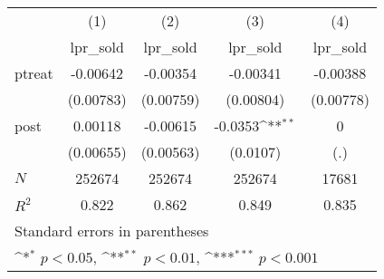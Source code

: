 {
\def\sym#1{\ifmmode^{#1}\else\(^{#1}\)\fi}
\begin{tabular}{l*{4}{c}}
\hline\hline
            &\multicolumn{1}{c}{(1)}&\multicolumn{1}{c}{(2)}&\multicolumn{1}{c}{(3)}&\multicolumn{1}{c}{(4)}\\
            &\multicolumn{1}{c}{lpr\_sold}&\multicolumn{1}{c}{lpr\_sold}&\multicolumn{1}{c}{lpr\_sold}&\multicolumn{1}{c}{lpr\_sold}\\
\hline
ptreat      &    -0.00642         &    -0.00354         &    -0.00341         &    -0.00388         \\
            &   (0.00783)         &   (0.00759)         &   (0.00804)         &   (0.00778)         \\
[1em]
post        &     0.00118         &    -0.00615         &     -0.0353\sym{**} &           0         \\
            &   (0.00655)         &   (0.00563)         &    (0.0107)         &         (.)         \\
\hline
\(N\)       &      252674         &      252674         &      252674         &       17681         \\
\(R^{2}\)   &       0.822         &       0.862         &       0.849         &       0.835         \\
\hline\hline
\multicolumn{5}{l}{\footnotesize Standard errors in parentheses}\\
\multicolumn{5}{l}{\footnotesize \sym{*} \(p<0.05\), \sym{**} \(p<0.01\), \sym{***} \(p<0.001\)}\\
\end{tabular}
}
